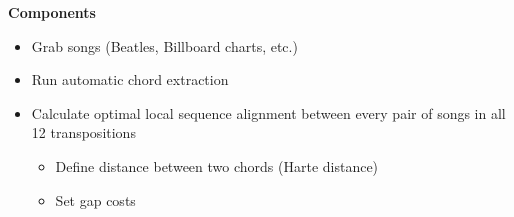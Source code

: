 \textbf{Components}

\begin{itemize}
\item Grab songs (Beatles, Billboard charts, etc.)
\item Run automatic chord extraction
\item Calculate optimal local sequence alignment between every pair of songs in all 12 transpositions
    \begin{itemize}
    \item Define distance between two chords (Harte distance)
    \item Set gap costs
    \end{itemize}
\end{itemize}